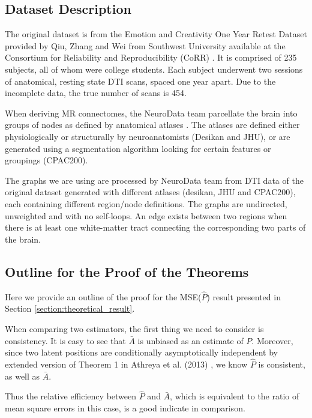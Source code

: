 \documentclass[a4paper]{article}
\begin{document}
\subsection{Dataset Description}
\label{section:data}
The original dataset is from the Emotion and Creativity One Year Retest Dataset provided by Qiu, Zhang and Wei from Southwest University available at the Consortium for Reliability and Reproducibility (CoRR) \cite{zuo2014open, gorgolewski2015high}. It is comprised of 235 subjects, all of whom were college students. Each subject underwent two sessions of anatomical, resting state DTI scans, spaced one year apart. Due to the incomplete data, the true number of scans is 454.

When deriving MR connectomes, the NeuroData team parcellate the brain into groups of nodes as defined by anatomical atlases \cite{neurodata, kiar2016graph}. The atlases are defined either physiologically or structurally by neuroanatomists (Desikan and JHU), or are generated using a segmentation algorithm looking for certain features or groupings (CPAC200).

The graphs we are using are processed by NeuroData team from DTI data of the original dataset generated with different atlases (desikan, JHU and CPAC200), each containing different region/node definitions. The graphs are undirected, unweighted and with no self-loops. An edge exists between two regions when there is at least one white-matter tract connecting the corresponding two parts of the brain.


\subsection{Outline for the Proof of the Theorems}
\label{section:outline_proof}
Here we provide an outline of the proof for the MSE($\hat{P}$) result presented in Section \ref{section:theoretical_result}.
	
When comparing two estimators, the first thing we need to consider is consistency.
It is easy to see that $\bar{A}$ is unbiased as an estimate of $P$. Moreover, since two latent positions are conditionally asymptotically independent by extended version of Theorem 1 in Athreya et al. (2013) \cite{athreya2013limit}, we know $\hat{P}$ is consistent, as well as $\bar{A}$.

Thus the relative efficiency between $\hat{P}$ and $\bar{A}$, which is equivalent to the ratio of mean square errors in this case, is a good indicate in comparison.
\end{document}

